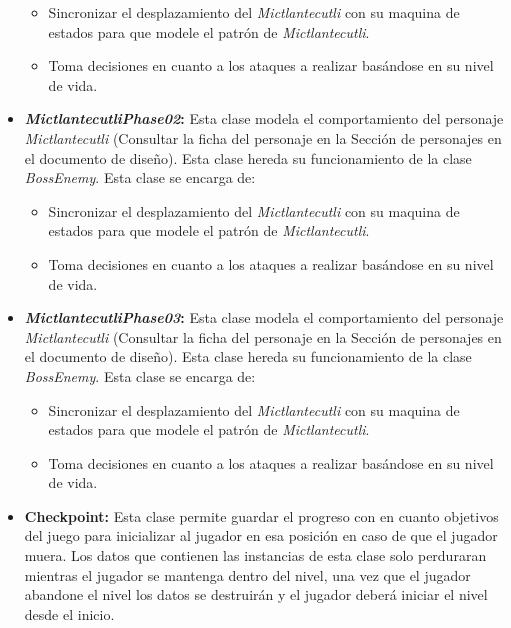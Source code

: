 \begin{itemize}
\begin{itemize}
				\item Sincronizar el desplazamiento del \textit{Mictlantecutli} con su maquina 
				de estados para que modele el patrón de \textit{Mictlantecutli}.
				\item Toma decisiones en cuanto a los ataques a realizar basándose en su 
				nivel de vida.
			\end{itemize}
			\item \textbf{\textit{MictlantecutliPhase02}:} Esta clase modela el 
			comportamiento del personaje \textit{Mictlantecutli} (Consultar la ficha 
			del personaje en la Sección de personajes en 
			el documento de diseño). Esta clase hereda su funcionamiento de la clase 
			\textit{BossEnemy}. Esta clase se encarga de:  
			\begin{itemize}
				\item Sincronizar el desplazamiento del \textit{Mictlantecutli} con su maquina 
				de estados para que modele el patrón de \textit{Mictlantecutli}.
				\item Toma decisiones en cuanto a los ataques a realizar basándose en su 
				nivel de vida.
			\end{itemize}
			\item \textbf{\textit{MictlantecutliPhase03}:} Esta clase modela el 
			comportamiento del personaje \textit{Mictlantecutli} (Consultar la ficha 
			del personaje en la Sección de personajes en 
			el documento de diseño). Esta clase hereda su funcionamiento de la clase 
			\textit{BossEnemy}. Esta clase se encarga de:  
			\begin{itemize}
				\item Sincronizar el desplazamiento del \textit{Mictlantecutli} con su maquina 
				de estados para que modele el patrón de \textit{Mictlantecutli}.
				\item Toma decisiones en cuanto a los ataques a realizar basándose en su 
				nivel de vida.
			\end{itemize}
			\item \textbf{Checkpoint:} Esta clase permite guardar el progreso con en 
			cuanto objetivos del juego para inicializar al jugador en esa posición
			en caso de que el jugador muera. Los datos que contienen las instancias de
			esta clase solo perduraran mientras el jugador se mantenga dentro del nivel,
			una vez que el jugador abandone el nivel los datos se destruirán y el jugador
			deberá iniciar el nivel desde el inicio.  

\end{itemize}
